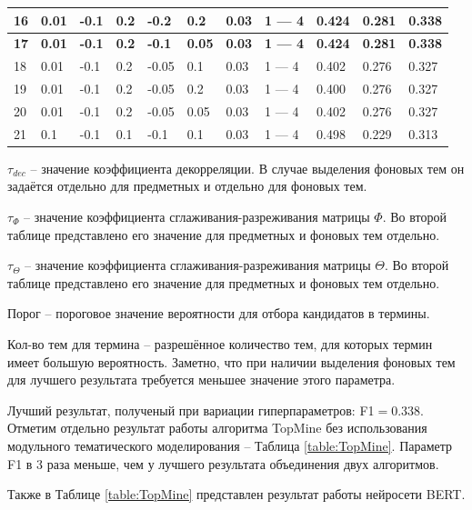 \documentclass[a4paper, 12pt]{article}
\begin{document}
\begin{table}[!ht]
\begin{tabular}{|l|l|l|l|l|l|l|p{50 pt}|l|l|l|}
        \textbf{16} & \textbf{0.01} & \textbf{-0.1} & \textbf{0.2} & \textbf{-0.2} & \textbf{0.2} & \textbf{0.03} & \textbf{1 — 4} & \textbf{0.424} & \textbf{0.281} & \textbf{0.338} \\ \hline
        \textbf{17} & \textbf{0.01} & \textbf{-0.1} & \textbf{0.2} & \textbf{-0.1} & \textbf{0.05} & \textbf{0.03} & \textbf{1 — 4} & \textbf{0.424} & \textbf{0.281} & \textbf{0.338} \\ \hline
        18 & 0.01 & -0.1 & 0.2 & -0.05 & 0.1 & 0.03 & 1 — 4 & 0.402 & 0.276 & 0.327 \\ \hline
        19 & 0.01 & -0.1 & 0.2 & -0.05 & 0.2 & 0.03 & 1 — 4 & 0.400 & 0.276 & 0.327 \\ \hline
        20 & 0.01 & -0.1 & 0.2 & -0.05 & 0.05 & 0.03 & 1 — 4 & 0.402 & 0.276 & 0.327 \\ \hline
        21 & 0.1 & -0.1 & 0.1 & -0.1 & 0.1 & 0.03 & 1 — 4 & 0.498 & 0.229 & 0.313 \\
        \hline
    \end{tabular}
\end{table}

    $\tau_{dec}$ -- значение коэффициента декорреляции. В случае выделения фоновых тем он задаётся отдельно для предметных и отдельно для фоновых тем.

    $\tau_{\Phi}$ -- значение коэффициента сглаживания-разреживания матрицы $\Phi$. Во второй таблице представлено его значение для предметных и фоновых тем отдельно.

    $\tau_{\Theta}$ -- значение коэффициента сглаживания-разреживания матрицы $\Theta$. Во второй таблице представлено его значение для предметных и фоновых тем отдельно.

    Порог -- пороговое значение вероятности для отбора кандидатов в термины.

    Кол-во тем для термина -- разрешённое количество тем, для которых термин имеет большую вероятность. Заметно, что при наличии выделения фоновых тем для лучшего результата требуется меньшее значение этого параметра.

    Лучший результат, полученый при вариации гиперпараметров: F1$= 0.338$. Отметим отдельно результат работы алгоритма TopMine без использования модульного тематического моделирования -- Таблица \ref{table:TopMine}. Параметр F1 в 3 раза меньше, чем у лучшего результата объединения двух алгоритмов.

    Также в Таблице \ref{table:TopMine} представлен результат работы нейросети BERT.
\end{document}
